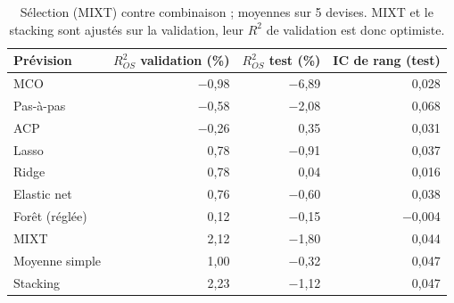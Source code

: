 \begin{table}[ht]
\centering
\small
\caption{Sélection (MIXT) contre combinaison ; moyennes sur 5 devises. MIXT et le stacking sont ajustés sur la validation, leur $R^2$ de validation est donc optimiste.}
\label{tab:combinaison}
\begin{tabular}{lrrr}
\toprule
Prévision & $R^2_{OS}$ validation (\%) & $R^2_{OS}$ test (\%) & IC de rang (test) \\
\midrule
MCO & $-$0,98 & $-$6,89 & 0,028 \\
Pas-à-pas & $-$0,58 & $-$2,08 & 0,068 \\
ACP & $-$0,26 & 0,35 & 0,031 \\
Lasso & 0,78 & $-$0,91 & 0,037 \\
Ridge & 0,78 & 0,04 & 0,016 \\
Elastic net & 0,76 & $-$0,60 & 0,038 \\
Forêt (réglée) & 0,12 & $-$0,15 & $-$0,004 \\
MIXT & 2,12 & $-$1,80 & 0,044 \\
Moyenne simple & 1,00 & $-$0,32 & 0,047 \\
Stacking & 2,23 & $-$1,12 & 0,047 \\
\bottomrule
\end{tabular}
\end{table}
